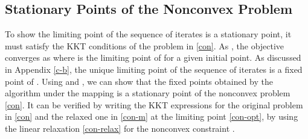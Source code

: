\begin{comment}
To show the set of fixed points \me{\mc{F}^\ast} are the minimizers for the objective function \me{f}, we rely on the strict monotonicity of the objective function for each iteration. Since \me{f(\mc{A}(\iterate{\ma}{i})) < f(\iterate{\ma}{i})}, the objective decreases monotonically for each iteration and the equality is achieved when \me{\ma^\ast \in \mc{A}(\ma^\ast)}, which is a generalized fixed point. Therefore, the fixed points in \me{\mc{F}^\ast} are the minimizers for the objective function \me{f} over the set \me{\mc{F}}.

If the uniqueness of the iterates are guaranteed, then the algorithm will find a unique solution at each iteration as \me{\iterate{\ma}{i+1} = \mc{A}(\iterate{\ma}{i})} and the accumulation point is unique. The convergence of the iterates to a single fixed point is guaranteed by the discussions in \cite{zangwill1969nonlinear,meyer1976sufficient}. Even though the algorithm finds a single fixed point, all fixed points in \me{\mc{F}^\ast} are equally valid as a minimizer for the function \me{f} in \eqref{con}, since the \ac{SINR} in \eqref{eq:SINR} is invariant to the unitary rotations on the beamformers.
\end{comment}

\subsection{Stationary Points of the Nonconvex Problem}
To show the limiting point of the sequence of iterates  is a stationary point, it must satisfy the \ac{KKT} conditions of the problem in \eqref{con}. As , the objective converges as
\iftoggle{single_column}{
\begin{equation} \label{con-opt}\allowdisplaybreaks
f(\iter{\mx}{\ast}{i},\iter{\my}{\ast}{i},\iter{\mz}{\ast|x}{i}) = f(\iter{\mx}{\ast}{i+1},\iter{\my}{\ast}{i},\iter{\mz}{\ast|y}{i+1}) = 
f(\iter{\mx}{\ast}{i+1},\iter{\my}{\ast}{i+1},\iter{\mz}{\ast|x}{i+1})
\end{equation}}{
\begin{multline} \label{con-opt}\allowdisplaybreaks
f(\iter{\mx}{\ast}{i},\iter{\my}{\ast}{i},\iter{\mz}{\ast|x}{i}) = f(\iter{\mx}{\ast}{i+1},\iter{\my}{\ast}{i},\iter{\mz}{\ast|y}{i+1}) \\ = 
f(\iter{\mx}{\ast}{i+1},\iter{\my}{\ast}{i+1},\iter{\mz}{\ast|x}{i+1})
\end{multline}}
where  is the limiting point of  for a given initial point. As discussed in Appendix \ref{c-b}, the unique limiting point of the sequence of iterates  is a fixed point of . Using \cite[Th. 10]{lanckriet2009convergence} and \cite[Th. 2 and 11]{scutari_1}, we can show that the fixed points obtained by the algorithm  under the mapping  is a stationary point of the nonconvex problem \eqref{con}. It can be verified by writing the \ac{KKT} expressions for the original problem in \eqref{con} and the relaxed one in \eqref{con-m} at the limiting point \eqref{con-opt}, by using the linear relaxation \eqref{con-relax} for the nonconvex constraint \cite{marks1978technical}.


